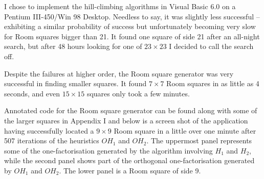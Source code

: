 I chose to implement the hill-climbing algorithms in Visual Basic 6.0 on a Pentium III-450/Win 98 Desktop.
Needless to say, it was slightly less successful – exhibiting a similar probability of success but unfortunately becoming very slow for Room squares bigger than 21.
It found one square of side 21 after an all-night search, but after 48 hours looking for one of $23 \times 23$ I decided to call the search off.

Despite the failures at higher order, the Room square generator was very successful in finding smaller squares.
It found $7 \times 7$ Room squares in as little as 4 seconds, and even $15 \times 15$ squares only took a few minutes.

Annotated code for the Room square generator can be found along with some of the larger squares in Appendix I and below is a screen shot of the application having successfully located a $9 \times 9$ Room square in a little over one minute after 507 iterations of the heuristics $OH_1$ and $OH_2$.
The uppermost panel represents some of the one-factorisation generated by the algorithm involving $H_1$ and $H_2$, while the second panel shows part of the orthogonal one-factorisation generated by $OH_1$ and $OH_2$.
The lower panel is a Room square of side 9.
